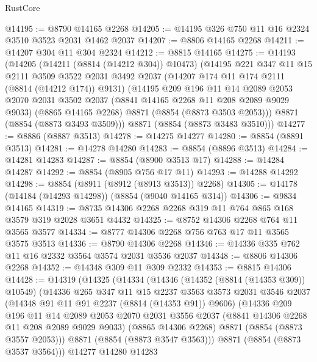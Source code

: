 \begin{lexlean}{RustCore}
\begin{coremodule}
@14195 := @8790 @14165 @2268
@14205 := @14195 @326 @750 @11 @16 @2324 @3510 @3523 @2031 @1462 @2037
@14207 := @8806 @14165 @2268
@14211 := @14207 @304 @11 @304 @2324
@14212 := @8815 @14165
@14275 := @14193
    (@14205
      (@14211 (@8814 (@14212 @304)) @10473)
      (@14195
        @221
        @347
        @11
        @15
        @2111
        @3509
        @3522
        @2031
        @3492
        @2037
        (@14207 @174 @11 @174 @2111 (@8814 (@14212 @174)) @9131)
        (@14195
          @209
          @196
          @11
          @14
          @2089
          @2053
          @2070
          @2031
          @3502
          @2037
          (@8841 @14165 @2268 @11 @208 @2089 @9029 @9033)
          (@8865 @14165 @2268)
          @8871
          (@8854 (@8873 @3503 @2053)))
        @8871
        (@8854 (@8873 @3493 @3509)))
      @8871
      (@8854 (@8873 @3483 @3510)))
@14277 := @8886 (@8887 @3513)
@14278 := @14275 @14277
@14280 := @8854 (@8891 @3513)
@14281 := @14278 @14280
@14283 := @8854 (@8896 @3513)
@14284 := @14281 @14283
@14287 := @8854 (@8900 @3513 @17)
@14288 := @14284 @14287
@14292 := @8854 (@8905 @756 @17 @11)
@14293 := @14288 @14292
@14298 := @8854 (@8911 (@8912 (@8913 @3513)) @2268)
@14305 := @14178 (@14184 (@14293 @14298)) (@8854 (@9040 @14165 @314))
@14306 := @9834 @14165
@14319 := @8735 @14306 @2268 @2268 @319 @11 @764 @865 @168 @3579 @319 @2028 @3651 @4432
@14325 := @8752 @14306 @2268 @764 @11 @3565 @3577
@14334 := @8777 @14306 @2268 @756 @763 @17 @11 @3565 @3575 @3513
@14336 := @8790 @14306 @2268
@14346 := @14336 @335 @762 @11 @16 @2332 @3564 @3574 @2031 @3536 @2037
@14348 := @8806 @14306 @2268
@14352 := @14348 @309 @11 @309 @2332
@14353 := @8815 @14306
@14428 := @14319
    (@14325
      (@14334
        (@14346
          (@14352 (@8814 (@14353 @309)) @10549)
          (@14336
            @265
            @347
            @11
            @15
            @2237
            @3563
            @3573
            @2031
            @3546
            @2037
            (@14348 @91 @11 @91 @2237 (@8814 (@14353 @91)) @9606)
            (@14336
              @209
              @196
              @11
              @14
              @2089
              @2053
              @2070
              @2031
              @3556
              @2037
              (@8841 @14306 @2268 @11 @208 @2089 @9029 @9033)
              (@8865 @14306 @2268)
              @8871
              (@8854 (@8873 @3557 @2053)))
            @8871
            (@8854 (@8873 @3547 @3563)))
          @8871
          (@8854 (@8873 @3537 @3564)))
        @14277
        @14280
        @14283

\end{coremodule}
\end{lexlean}
